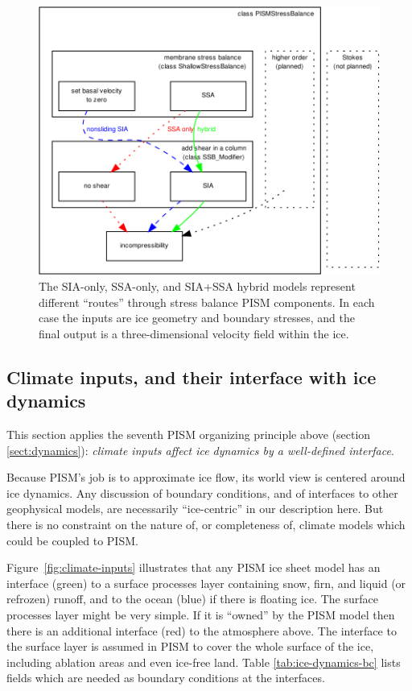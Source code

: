 \documentclass[titlepage,letterpaper,final]{scrartcl}
\begin{document}
\begin{figure}
  \centering
  \includegraphics[width=6in]{../../src/base/stressbalance/figs/stressbalance}
  \caption{The SIA-only, SSA-only, and SIA+SSA hybrid models represent different ``routes'' through stress balance PISM components.  In each case the inputs are ice geometry and boundary stresses, and the final output is a three-dimensional velocity field within the ice.}
  \label{fig:stressbalance}
\end{figure}


\subsection{Climate inputs, and their interface with ice dynamics}
\label{sec:climate-inputs}  This section applies the seventh PISM organizing principle above (section \ref{sect:dynamics}): \emph{climate inputs affect ice dynamics by a well-defined interface}.

Because PISM's job is to approximate ice flow, its world view is centered around ice dynamics.  Any discussion of boundary conditions, and of interfaces to other geophysical models, are necessarily ``ice-centric'' in our description here.  But there is no constraint on the nature of, or completeness of, climate models which could be coupled to PISM.

Figure~\ref{fig:climate-inputs} illustrates that any PISM ice sheet model has an interface (green) to a surface processes layer containing snow, firn, and liquid (or refrozen) runoff, and to the ocean (blue) if there is floating ice.  The surface processes layer might be very simple.  If it is ``owned'' by the PISM model then there is an additional interface (red) to the atmosphere above.  The interface to the surface layer is assumed in PISM to cover the whole surface of the ice, including ablation areas and even ice-free land.  Table \ref{tab:ice-dynamics-bc} lists fields which are needed as boundary conditions at the interfaces.
\end{document}
